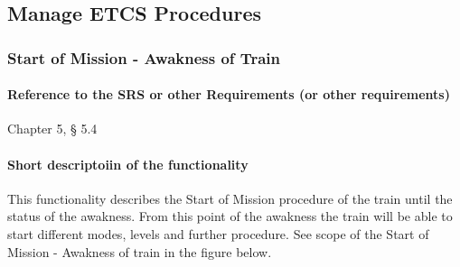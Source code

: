 
\subsection{Manage ETCS Procedures}

\subsubsection{Start of Mission - Awakness of Train}%
\paragraph{Reference to the SRS or other Requirements (or other requirements)}
Chapter 5, § 5.4
\paragraph{Short descriptoiin of the functionality}
This functionality describes the Start of Mission procedure of the train until the status of the awakness. From this point of the awakness the train will be able to start different modes, levels and further procedure.
See scope of the Start of Mission - Awakness of train in the figure below.

